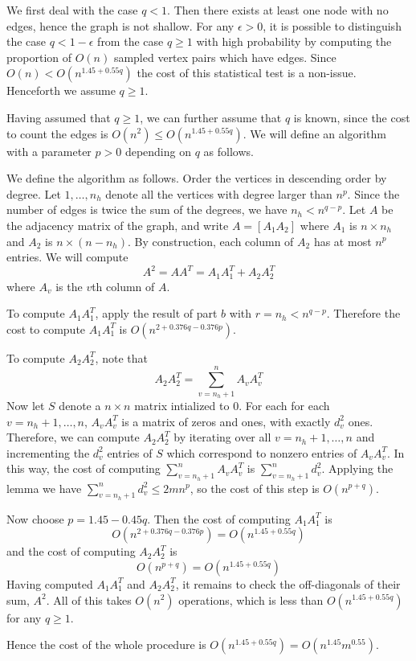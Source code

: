 \documentclass[11pt]{article}
\begin{document}
We first deal with the case $q < 1$.  Then there exists at least one
node with no edges, hence the graph is not shallow.  For any $\epsilon
> 0$, it is possible to distinguish the case $q < 1 - \epsilon$ from
the case $q \geq 1$ with high probability by computing the proportion
of $O(n)$ sampled vertex pairs which have edges.  Since $O(n) <
O(n^{1.45 + 0.55q})$ the cost of this statistical test is a non-issue.
Henceforth we assume $q \geq 1$.

Having assumed that $q \geq 1$, we can further assume that $q$ is
known, since the cost to count the edges is $O(n^2) \leq O(n^{1.45 +
  0.55q})$.  We will define an algorithm with a parameter $p > 0$
depending on $q$ as follows.

We define the algorithm as follows.  Order the vertices in descending
order by degree.  Let $1,\hdots, n_h$ denote all the vertices with
degree larger than $n^p$.  Since the number of edges is twice the sum
of the degrees, we have $n_h < n^{q-p}$.  Let $A$ be the adjacency
matrix of the graph, and write $A = [A_1 A_2]$ where $A_1$ is $n
\times n_h$ and $A_2$ is $n \times (n-n_h)$.  By construction, each
column of $A_2$ has at most $n^p$ entries.  We will compute
\[
A^2 = AA^T = A_1 A_1^T + A_2 A_2^T
\]
where $A_v$ is the $v$th column of $A$.

To compute $A_1 A_1^T$, apply the result of part $b$ with $r = n_h <
n^{q-p}$.  Therefore the cost to compute $A_1 A_1^T$ is
$O(n^{2 +0.376q-0.376p})$.

To compute $A_2 A_2^T$, note that
\[A_2 A_2^T = \sum_{v = n_h + 1}^n A_v A_v^T\]
Now let $S$ denote a $n \times n$ matrix intialized to $0$.  For each
for each $v = n_h+1,\hdots, n$, $A_v A_v^T$ is a matrix of zeros and
ones, with exactly $d_v^2$ ones.  Therefore, we can compute $A_2
A_2^T$ by iterating over all $v = n_h + 1,\hdots, n$ and incrementing
the $d_v^2$ entries of $S$ which correspond to nonzero entries of $A_v
A_v^T$.  In this way, the cost of computing $\sum_{v = n_h + 1}^n A_v
A_v^T$ is $\sum_{v = n_h + 1}^n d_v^2$.  Applying the lemma we have
$\sum_{v = n_h + 1}^n d_v^2 \leq 2 m n^p$, so the cost of this step is
$O(n^{p+q})$.

Now choose $p = 1.45 - 0.45 q$.
Then the cost of computing $A_1 A_1^T$ is 
\[
O(n^{2 + 0.376q-0.376p}) = O(n^{1.45 + 0.55 q})
\]
and the cost of computing $A_2 A_2^T$ is
\[
O(n^{p + q}) = O(n^{1.45 + 0.55q})
\]
Having computed $A_1 A_1^T$ and $A_2 A_2^T$, it remains to check the
off-diagonals of their sum, $A^2$.  All of this takes $O(n^2)$
operations, which is less than $O(n^{1.45 + 0.55q})$ for any $q \geq
1$.

Hence the cost of the whole procedure is $O(n^{1.45 + 0.55q}) =
O(n^{1.45} m^{0.55})$.
\end{document}
